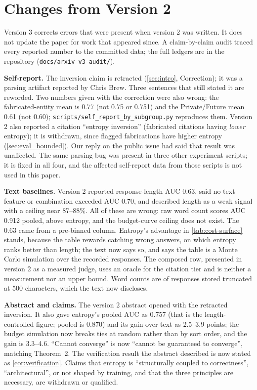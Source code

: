 \documentclass[11pt]{article}
\newcommand{\fakepara}[1]{\noindent\textbf{#1}\xspace}
\begin{document}
\section{Changes from Version 2}\label{app:changes}

Version 3 corrects errors that were present when version 2 was written. It does
not update the paper for work that appeared since. A claim-by-claim audit traced
every reported number to the committed data; the full ledgers are in the
repository (\texttt{docs/arxiv\_v3\_audit/}).

\fakepara{Self-report.} The inversion claim is retracted (\autoref{sec:intro},
Correction); it was a parsing artifact reported by Chris Brew. Three sentences
that still stated it are reworded. Two numbers given with the correction were
also wrong: the fabricated-entity mean is 0.77 (not 0.75 or 0.751) and the
Private/Future mean 0.61 (not 0.60); \texttt{scripts/self\_report\_by\_subgroup.py}
reproduces them. Version 2 also reported a citation ``entropy inversion'' (fabricated citations
having \emph{lower} entropy); it is withdrawn, since flagged fabrications have
higher entropy (\autoref{sec:eval_bounded}). Our reply on the public issue had
said that result was unaffected. The same parsing bug was present in three other
experiment scripts; it is fixed in all four, and the affected self-report data
from those scripts is not used in this paper.

\fakepara{Text baselines.} Version 2 reported response-length AUC 0.63, said no
text feature or combination exceeded AUC 0.70, and described length as a weak
signal with a ceiling near 87--88\%. All of these are wrong: raw word count
scores AUC 0.912 pooled, above entropy, and the budget-curve ceiling does not
exist. The 0.63 came from a pre-binned column. Entropy's advantage in
\autoref{tab:cost-surface} stands, because the table rewards catching wrong
answers, on which entropy ranks better than length; the text now says so, and
says the table is a Monte Carlo simulation over the recorded responses. The
composed row, presented in version 2 as a measured judge, uses an oracle for the
citation tier and is neither a measurement nor an upper bound. Word counts are of
responses stored truncated at 500 characters, which the text now discloses.

\fakepara{Abstract and claims.} The version 2 abstract opened with the
retracted inversion. It also gave entropy's pooled AUC as 0.757 (that is the
length-controlled figure; pooled is 0.870) and its gain over text as 2.5--3.9
points; the budget simulation now breaks ties at random rather than by sort
order, and the gain is 3.3--4.6. ``Cannot converge'' is now ``cannot be
guaranteed to converge'', matching Theorem~2. The verification result the
abstract described is now stated as \autoref{cor:verification}. Claims that
entropy is ``structurally coupled to correctness'', ``architectural'', or not
shaped by training, and that the three principles are necessary, are withdrawn
or qualified.
\end{document}
